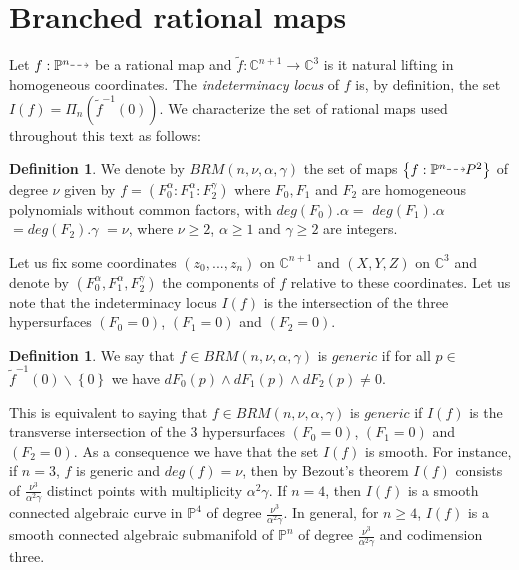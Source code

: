 \documentclass{amsart}
\theoremstyle{definition}
\newtheorem{definition}[theorem]{Definition}
\theoremstyle{proposition}
\numberwithin{equation}{section}
\theoremstyle{main}
\begin{document}
\section {Branched rational maps}

Let $f : {\mathbb P^n}  {\mathbin{\tikz [baseline=-0.25ex,-latex, dashed,->,densely dashed    ] \draw [->,densely dashed    ] (0pt,
0.5ex) -- (1.3em,0.5ex);}}$ be a rational map and $\tilde{f}: {\mathbb C^{n+1}} \to {\mathbb C^3}$ is it natural lifting in homogeneous coordinates.
The \emph{indeterminacy locus} of $f$ is, by definition, the set $I\left(f\right)=\Pi_{n}\left(\tilde{f}^{-1}\left(0\right)\right)$. We characterize the set of rational maps used throughout this text as follows:

\begin{definition} We denote by $BRM\left(n,\nu,\alpha,\gamma\right)$ the set of maps \break $\left\{f: \mathbb P^n  {\mathbin{\tikz [baseline=-0.25ex,-latex, dashed,->,densely dashed    ] \draw [->,densely dashed    ] (0pt,
0.5ex) -- (1.3em,0.5ex);}} P^2\right\}$ of degree $\nu$ given by $f=\left(F_{0}^\alpha:F_{1}^\alpha:F^\gamma_{2}\right)$  where $F_{0},F_{1}$ and $F_{2}$ are homogeneous polynomials without common factors, with $deg\left(F_{0}\right).\alpha=$ $deg\left(F_{1}\right).\alpha$ $=deg\left(F_{2}\right).\gamma$ $=\nu$, where $\nu\geq 2$, $\alpha\geq1$  and $\gamma \geq 2$ are integers.\end{definition}

Let us fix some coordinates $\left(z_{0},...,z_{n} \right)$ on $\mathbb C^{n+1}$ and $\left(X,Y,Z\right)$ on $\mathbb C^{3}$ and denote by $\left(F^\alpha_{0},F^\alpha_{1},F^\gamma_{2}\right)$ the components of $f$ relative to these coordinates. Let us note that the indeterminacy locus $I(f)$ is the intersection of the three hypersurfaces $(F_{0}=0)$, $(F_{1}=0)$ and $(F_{2}=0)$.

\begin{definition}\label{generic} We say that $f  \in BRM\left(n,\nu,\alpha,\gamma\right)$ is $generic$ if for all $p \in$ $\tilde{f}^{-1}\left(0\right)\backslash\left\{0\right\}$ we have $dF_{0}\left(p\right)\wedge dF_{1}\left(p\right)\wedge dF_{2}\left(p\right) \neq 0.$  
\end{definition}

This is equivalent to saying that $f  \in BRM\left(n,\nu,\alpha,\gamma\right)$ is $generic$ if $I(f)$ is the transverse intersection of the $3$ hypersurfaces $(F_{0}=0)$, $(F_{1}=0)$ and $(F_{2}=0)$.  As a consequence we have that  the set $I(f)$ is smooth. For instance, if $n=3$, $f$ is generic and $deg(f)=\nu$, then by Bezout's theorem $I\left(f\right)$ consists of $\frac{\nu^{3}}{\alpha^2\gamma}$ distinct points with multiplicity ${\alpha^2\gamma}$. If $n=4$, then $I\left(f\right)$ is a smooth connected algebraic curve in $\mathbb P^4$ of degree $\frac{\nu^{3}}{\alpha^2\gamma}$. In general, for $n \geq 4$, $I\left(f\right)$ is a smooth connected algebraic submanifold of $\mathbb P^n$ of degree $\frac{\nu^{3}}{\alpha^2\gamma}$ and codimension three. 
\end{document}

